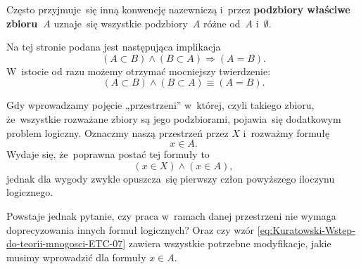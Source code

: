 \documentclass[a4paper,11pt]{article}
\begin{document}
\noindent
{} Często przyjmuje~się inną konwencję nazewniczą i~przez
\textbf{podzbiory właściwe zbioru~$A$} uznaje~się wszystkie podzbiory~$A$
różne od~$A$ i~$\emptyset$.

\vspace{\spaceFour}





\noindent
{} Na tej stronie podana jest następująca implikacja
\begin{equation}
  \label{eq:Kuratowski-Wstep-do-teorii-mnogosci-ETC-05}
  ( A \subset B ) \land ( B \subset A ) \Rightarrow ( A = B ).
\end{equation}
W~istocie od razu możemy otrzymać mocniejszy twierdzenie:
\begin{equation}
  \label{eq:Kuratowski-Wstep-do-teorii-mnogosci-ETC-06}
  ( A \subset B ) \land ( B \subset A ) \equiv ( A = B ).
\end{equation}

\vspace{\spaceFour}





\noindent
{} Gdy wprowadzamy pojęcie „przestrzeni” w~której, czyli takiego
zbioru, że~wszystkie rozważane zbiory są jego podzbiorami, pojawia~się
dodatkowym problem logiczny. Oznaczmy naszą przestrzeń przez $X$ i~rozważmy
formułę
\begin{equation}
  \label{eq:Kuratowski-Wstep-do-teorii-mnogosci-ETC-06}
  x \in A.
\end{equation}
Wydaje się, że~poprawna postać tej formuły to
\begin{equation}
  \label{eq:Kuratowski-Wstep-do-teorii-mnogosci-ETC-07}
  ( x \in X ) \land ( x \in A ),
\end{equation}
jednak dla wygody zwykle opuszcza~się pierwszy człon powyższego iloczynu
logicznego.

Powstaje jednak pytanie, czy praca w~ramach danej przestrzeni nie wymaga
doprecyzowania innych formuł logicznych? Oraz czy wzór
\eqref{eq:Kuratowski-Wstep-do-teorii-mnogosci-ETC-07}
zawiera wszystkie potrzebne modyfikacje, jakie musimy wprowadzić dla formuły
$x \in A$.

\vspace{\spaceFour}
\end{document}
